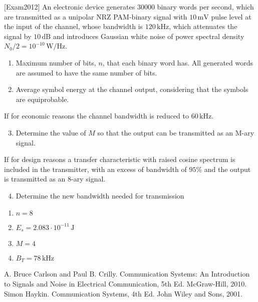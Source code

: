 \documentclass[es,boletin]{uah}
\begin{document}
	{
		[Exam2012] An electronic device generates $30000$ binary words per second, which are transmitted as a unipolar NRZ PAM-binary signal with $10\,\textrm{mV}$ pulse level at the input of the channel, whose bandwidth is $120\, \textrm{kHz}$, which attenuates the signal by $10\,\textrm{dB}$ and introduces Gaussian white noise of power spectral density $N_0/2 = 10^{-10}\,\textrm{W/Hz} $.

	\begin{enumerate}
		\item Maximum number of bits, $n$, that each binary word has. All generated words are assumed to have the same number of bits.
		\item Average symbol energy at the channel output, considering that the symbols are equiprobable.
	\end{enumerate}

	If for economic reasons the channel bandwidth is reduced to $60 \,\textrm{kHz}$.

	\begin{enumerate}
		\setcounter{enumi}{2}
		\item Determine the value of $M$ so that the output can be transmitted as an M-ary signal.
	\end{enumerate}

	If for design reasons a transfer characteristic with raised cosine spectrum is included in the transmitter, with an excess of bandwidth of $95\%$ and the output is transmitted as an 8-ary signal.
	
	\begin{enumerate}
		\setcounter{enumi}{3}
\item Determine the new bandwidth needed for transmission
	\end{enumerate}
	}{
		\begin{enumerate}
			\item $n=8$
			   \item $E_s = 2.083\cdot 10^{-11}\,\textrm{J}$
			 \item  $M=4$
		  \item $B_T = 78 \,\textrm{kHz}$
		\end{enumerate}
	}



\begin{thebibliography}{100}
 A. Bruce Carlson and Paul B. Crilly. Communication Systems: An Introduction to Signals and Noise in Electrical Communication, 5th Ed. McGraw-Hill, 2010.
  Simon Haykin. Communication Systems, 4th Ed. John Wiley and Sons, 2001.
\end{thebibliography}
\end{document}
